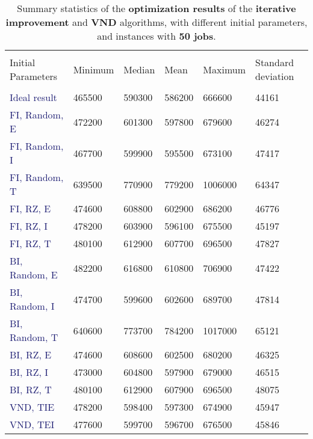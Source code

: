 \documentclass[
12pt,
a4paper,
oneside,
headinclude,
footinclude]{article}
\theoremstyle{definition} %
\begin{document}
    \begin{table}[H]
        \centering %
        \begin{tabular}{l l l l l l} %
            \hline
            \hline 
            \\[-1.5ex]
            \textcolor{BrickRed}{Initial Parameters} & \textcolor{BrickRed}{Minimum} & \textcolor{BrickRed}{Median} & \textcolor{BrickRed}{Mean} & \textcolor{BrickRed}{Maximum} & \textcolor{BrickRed}{Standard deviation}\\ [0.5ex]
            \hline %
            \\[-1.5ex]
            \textcolor{MidnightBlue}{Ideal result}  & 465500  &  590300 & 586200  &  666600 & 44161\\
            \textcolor{MidnightBlue}{FI, Random, E}  & 472200 & 601300 & 597800  &  679600 & 46274\\
            \textcolor{MidnightBlue}{FI, Random, I}  & 467700 & 599900 & 595500  &  673100 & 47417\\
            \textcolor{MidnightBlue}{FI, Random, T}  & 639500 & 770900 & 779200  & 1006000 & 64347\\
            \textcolor{MidnightBlue}{FI, RZ, E}      & 474600 & 608800 & 602900  &  686200 & 46776\\
            \textcolor{MidnightBlue}{FI, RZ, I}      & 478200 & 603900 & 596100  &  675500 & 45197\\
            \textcolor{MidnightBlue}{FI, RZ, T}      & 480100 & 612900 & 607700  &  696500 & 47827\\
            \textcolor{MidnightBlue}{BI, Random, E}  & 482200 & 616800 & 610800  &  706900 & 47422\\
            \textcolor{MidnightBlue}{BI, Random, I}  & 474700 & 599600 & 602600  &  689700 & 47814\\
            \textcolor{MidnightBlue}{BI, Random, T}  & 640600 & 773700 & 784200  & 1017000 & 65121\\
            \textcolor{MidnightBlue}{BI, RZ, E}      & 474600 & 608600 & 602500  &  680200 & 46325\\
            \textcolor{MidnightBlue}{BI, RZ, I}      & 473000 & 604800 & 597900  &  679000 & 46515\\
            \textcolor{MidnightBlue}{BI, RZ, T}      & 480100 & 612900 & 607900  &  696500 & 48075\\
            \textcolor{MidnightBlue}{VND, TIE}         & 478200   &   598400 &  597300    &   674900   & 45947\\
            \textcolor{MidnightBlue}{VND, TEI}         & 477600    &   599700 &  596700   &   676500   & 45846
            
            \\[1ex] %
            \hline %
        \end{tabular}
        \caption{\label{tab:50-res}Summary statistics of the \textbf{optimization results} of the \textbf{iterative improvement} and \textbf{VND} algorithms, with different initial parameters, and instances with \textbf{50 jobs}.}
    \end{table} 
\end{document}
